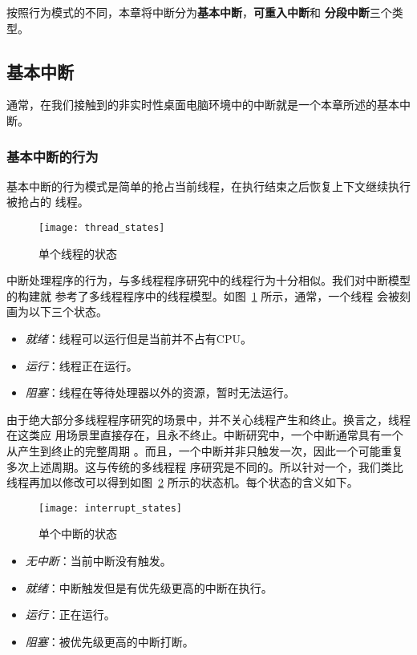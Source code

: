 按照行为模式的不同，本章将中断分为\textbf{基本中断}，\textbf{可重入中断}和
\textbf{分段中断}三个类型。

\subsection{基本中断}
\label{subsec:basic}

通常，在我们接触到的非实时性桌面电脑环境中的中断就是一个本章所述的基本中断。

\subsubsection{基本中断的行为}
\label{subsubsec:basic_behavior}

基本中断的行为模式是简单的抢占当前线程，在执行结束之后恢复上下文继续执行被抢占的
线程。

\begin{figure}[H]
	\centering
	\texttt{[image: thread\_states]}
	\caption{单个线程的状态}
	\label{fig:thread_state}
\end{figure}

中断处理程序的行为，与多线程程序研究中的线程行为十分相似。我们对中断模型的构建就
参考了多线程程序中的线程模型。如图~\ref{fig:thread_state} 所示，通常，一个线程
会被刻画为以下三个状态。

\begin{itemize}
	\item \emph{就绪}：线程可以运行但是当前并不占有CPU。
	\item \emph{运行}：线程正在运行。
	\item \emph{阻塞}：线程在等待处理器以外的资源，暂时无法运行。
\end{itemize}

由于绝大部分多线程程序研究的场景中，并不关心线程产生和终止。换言之，线程在这类应
用场景里直接存在，且永不终止。中断研究中，一个中断通常具有一个从产生到终止的完整周期
。而且，一个中断并非只触发一次，因此一个可能重复多次上述周期。这与传统的多线程程
序研究是不同的。所以针对一个，我们类比线程再加以修改可以得到如图~\ref{fig:interrupt_state} 
所示的状态机。每个状态的含义如下。

\begin{figure}[H]
	\centering
	\texttt{[image: interrupt\_states]}
	\caption{单个中断的状态}
	\label{fig:interrupt_state}
\end{figure}

\begin{itemize}
	\item \emph{无中断}：当前中断没有触发。
	\item \emph{就绪}：中断触发但是有优先级更高的中断在执行。
	\item \emph{运行}：正在运行。
	\item \emph{阻塞}：被优先级更高的中断打断。
\end{itemize}

